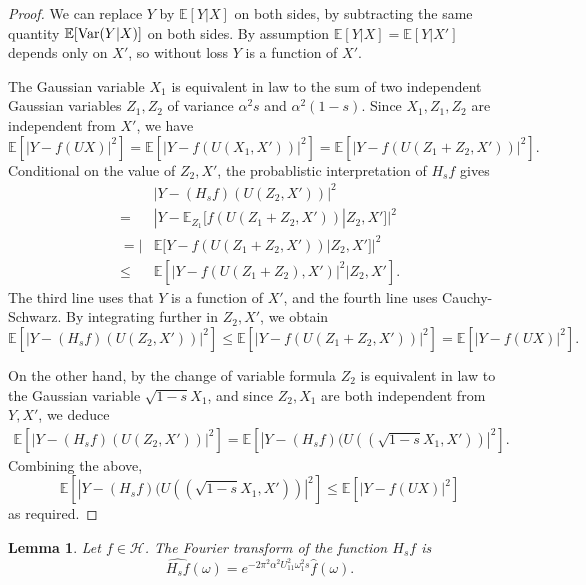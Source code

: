 \documentclass[a4paper]{article}
\newtheorem{lem}[thm]{Lemma}
\theoremstyle{definition}
\newcommand{\E}{\mathbb{E}}
\newcommand{\1}{\mathbbm{1}}
\begin{document}
	
	\begin{proof}
		We can replace $Y$ by $\E[Y|X]$ on both sides, by subtracting the same quantity $\E[  {\rm Var}(Y|X)  ]$ on both sides. By assumption $\E[Y|X]=\E[Y|X']$ depends only on $X'$, so without loss $Y$ is a function of $X'$. 
		
		
		The Gaussian variable $X_1$ is equivalent in law to the sum of two independent Gaussian variables 
		$Z_1, Z_2$ of variance $\alpha^2 s$ and $\alpha^2(1-s)$. Since $X_1, Z_1, Z_2$ are independent from $X'$, we have
		\[
		\E[|Y-f(UX)|^2] = \E[  |Y-f(U(X_1, X'))|^2  ]=  \E[|Y-f(U(Z_1+Z_2, X'))|^2] .
		\]
		Conditional on the value of $Z_2, X'$, the probablistic interpretation of $H_sf$ gives
		\begin{equation*}
			\begin{split}
				&     | Y-(H_s f)(U(Z_2, X'))|^2
				\\
				=&| Y-\E_{Z_1}[ f(U(Z_1+Z_2, X'))|  Z_2, X']  |^2
				\\
				=|& \E[ Y- f(U(Z_1+Z_2, X'))|  Z_2, X']  |^2
				\\
				\leq &  \E[      |Y-f(U(Z_1+Z_2), X')   |^2        |Z_2, X'  ].
			\end{split}
		\end{equation*}
		The third line uses that $Y$ 
		is a function of $X'$, and the fourth line uses Cauchy-Schwarz. 
		By integrating further in $Z_2, X'$, we obtain
		\begin{equation}
			\E [| Y-(H_s f)(U(Z_2, X'))|^2]\leq   \E[|Y-f(U(Z_1+Z_2, X'))|^2] =   \E[|Y-f(UX)|^2].
		\end{equation}
		
		
		
		
		
		On the other hand, by the change of variable formula $Z_2$ is equivalent in law to the Gaussian variable $\sqrt{1-s} X_1$, and since $Z_2, X_1$ are both independent from $Y, X'$, we deduce
		\[
		\begin{split}
			\E [| Y-(H_s f)(U(Z_2, X'))|^2] 
			= \E [| Y-(H_s f)(U( (\sqrt{1-s} X_1, X'))|^2] .
		\end{split}
		\]
		Combining the above,
		\[
		\E [| Y-(H_s f)(U( (\sqrt{1-s} X_1, X'))|^2] \leq \E[|Y-f(UX)|^2]
		\]
		as required.
	\end{proof}
	
	
	
	
	
	
	
	\begin{lem}\label{lem:convolution2}
		Let $f\in \mathcal{H}$. 
		The Fourier transform of the function $H_sf $ is 
		\[
		\widehat{ H_s f}(\omega)=  e^{-2\pi^2\alpha^2 U_{11}^2\omega_1^2 s} \hat{f}(\omega).
		\]
	\end{lem}
	
\end{document}
